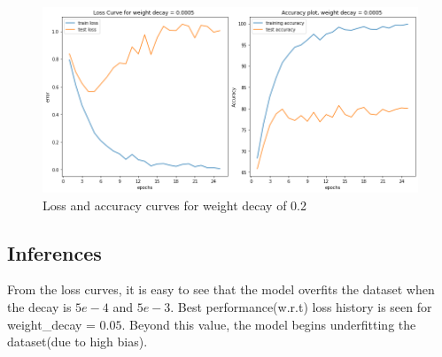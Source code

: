 \documentclass{article}
\begin{document}
\begin{figure}[h]
	\centering
	\includegraphics[scale=0.3]{../code/images/decay0.0005.png}
	\caption{Loss and accuracy curves for weight decay of 0.2}
	\label{fig:decay5}
\end{figure}

\subsection*{Inferences}
From the loss curves, it is easy to see that the model overfits the dataset when the decay is $5e-4$ and $5e-3$. Best performance(w.r.t) loss history is seen for weight\_decay = $0.05$. Beyond this value, the model begins underfitting the dataset(due to high bias).
\end{document}
